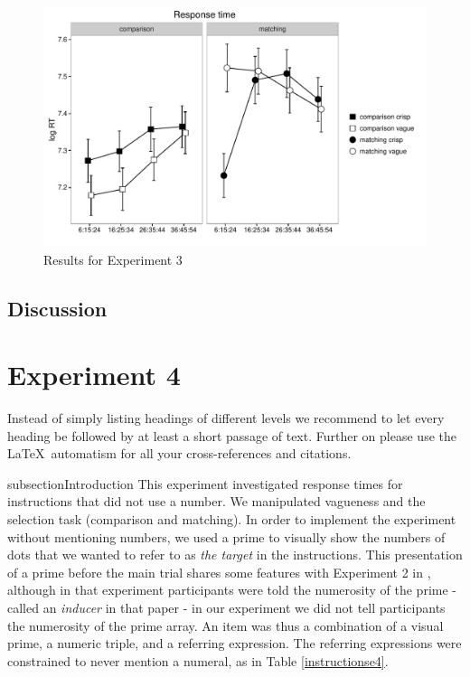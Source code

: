 \begin{figure}[htbp]
\centering
\includegraphics[width=.75\textwidth]{images/response-time-two-panels-1.pdf}
\caption{Results for Experiment 3}
\label{resultse3}
\end{figure}

\subsection{Discussion}
\textcolor{red}{\lipsum[1]}

\section{Experiment 4}
\label{sec:5}
Instead of simply listing headings of different levels we recommend to let every heading be followed by at least a short passage of text. Further on please use the \LaTeX\ automatism for all your cross-references and citations.

subsection{Introduction}
This experiment investigated response times for instructions that did not use a number. 
We manipulated vagueness and the selection task (comparison and matching). 
In order to implement the experiment without mentioning numbers,  we used a prime to visually show the numbers of dots that we wanted to refer to as {\em the target} in the instructions. 
This presentation of a prime before the main trial shares some features with Experiment 2 in \protect \citet{Izard20081221}, although in that experiment participants were told the numerosity of the prime - called an \emph{inducer} in that paper - in our experiment we did not tell participants the numerosity of the prime array.
An item was thus a combination of a visual prime, a numeric triple, and a referring expression.
The referring expressions were constrained to never mention a numeral, as in Table \ref{instructionse4}. 


